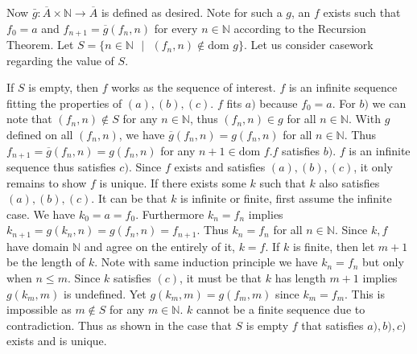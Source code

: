 \documentclass{article}
\begin{document}
\begin{enumerate}
		Now $\bar{g}: \overline{A} \times \mathbb{N} \xrightarrow{} \overline{A}$ is defined as desired. Note for such a $g$, an $f$ exists such that $f_0 = a$ and $f_{n + 1} = \overline{g}(f_n, n)$ for every $n \in \mathbb{N}$ according to the Recursion Theorem. Let $S = \{n \in \mathbb{N} \text{ } | \text{ } (f_n, n) \notin \text{dom } g\}$. Let us consider casework regarding the value of $S$.
		
		\medskip
		 If $S$ is empty, then $f$ works as the sequence of interest. $f$ is an infinite sequence fitting the properties of $(a), (b), (c)$. $f$ fits $a)$ because $f_0 = a$. For $b)$ we can note that $(f_n, n) \notin S$ for any $n \in \mathbb{N}$, thus $(f_n, n) \in g$ for all $n \in \mathbb{N}$. With $g$ defined on all $(f_n, n)$, we have $\overline{g}(f_n, n) = g(f_n, n)$ for all $n \in \mathbb{N}$. Thus $f_{n + 1} = \overline{g}(f_n, n) = g(f_n, n)$ for any $n + 1 \in \text{dom }f$.$f$ satisfies $b)$. $f$ is an infinite sequence thus satisfies $c)$. Since $f$ exists and satisfies $(a),(b),(c)$, it only remains to show $f$ is unique. If there exists some $k$ such that $k$ also satisfies $(a),(b),(c)$. It can be that $k$ is infinite or finite, first assume the infinite case. We have $k_0 = a = f_0$. Furthermore $k_n = f_n$ implies $k_{n + 1} = g(k_n, n) = g(f_n, n) = f_{n + 1}$. Thus $k_n = f_n$ for all $n \in \mathbb{N}$. Since $k, f$ have domain $\mathbb{N}$ and agree on the entirely of it, $k = f$. If $k$ is finite, then let $m + 1$ be the length of $k$. Note with same induction principle we have $k_{n} = f_{n}$ but only when $n \leq m$. Since $k$ satisfies $(c)$, it must be that $k$ has length $m + 1$ implies $g(k_m, m)$ is undefined. Yet $g(k_m, m) = g(f_m, m)$ since $k_m = f_m$. This is impossible as $m \notin S$ for any $m \in \mathbb{N}$. $k$ cannot be a finite sequence due to contradiction. Thus as shown in the case that $S$ is empty $f$ that satisfies $a), b), c)$ exists and is unique.
		 		 

\end{enumerate}
\end{document}

